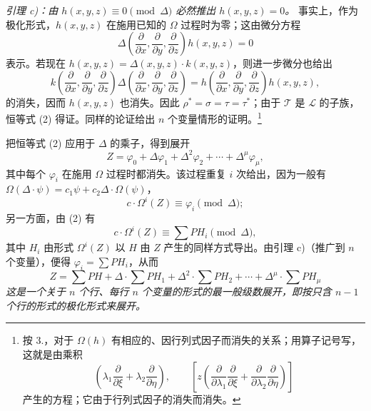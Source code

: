 \emph{引理 c)：由 $h(x,y,z)\equiv0\pmod{\Delta}$ 必然推出 $h(x,y,z)=0$。} 事实上，作为极化形式，$h(x,y,z)$ 在施用已知的 $\Omega$ 过程时为零；这由微分方程
\[
  \Delta\!\left(\frac{\partial}{\partial x},\frac{\partial}{\partial y},\frac{\partial}{\partial z}\right)h(x,y,z)=0
\]
表示。若现在 $h(x,y,z)=\Delta(x,y,z)\cdot k(x,y,z)$，则进一步微分也给出
\[
  k\!\left(\frac{\partial}{\partial x},\frac{\partial}{\partial y},\frac{\partial}{\partial z}\right)
  \Delta\!\left(\frac{\partial}{\partial x},\frac{\partial}{\partial y},\frac{\partial}{\partial z}\right)
  =
  h\!\left(\frac{\partial}{\partial x},\frac{\partial}{\partial y},\frac{\partial}{\partial z}\right)h(x,y,z),
\]
的消失，因而 $h(x,y,z)$ 也消失。因此 $\rho^*=\sigma=\tau=\tau^*$；由于 $\mathcal T$ 是 $\mathcal L$ 的子族，恒等式 (2) 得证。同样的论证给出 $n$ 个变量情形的证明。\footnote{按 3.，对于 $\Omega(h)$ 有相应的、因行列式因子而消失的关系；用算子记号写，这就是由乘积
\[
 \left(\lambda_1\frac{\partial}{\partial \xi}+\lambda_2\frac{\partial}{\partial \eta}\right),
 \qquad
 \left[z\left(\frac{\partial}{\partial\lambda_1}\frac{\partial}{\partial \xi}
 +\frac{\partial}{\partial\lambda_2}\frac{\partial}{\partial \eta}\right)\right]
\]
产生的方程；它由于行列式因子的消失而消失。}

把恒等式 (2) 应用于 $\Delta$ 的乘子，得到展开
\[
  Z=\varphi_0+\Delta\varphi_1+\Delta^2\varphi_2+\cdots+\Delta^\mu\varphi_\mu,
\]
其中每个 $\varphi_i$ 在施用 $\Omega$ 过程时都消失。该过程重复 $i$ 次给出，因为一般有 $\Omega(\Delta\cdot\psi)=c_1\psi+c_2\Delta\cdot\Omega(\psi)$，
\[
  c\cdot \Omega^i(Z)\equiv\varphi_i\pmod{\Delta};
\]
另一方面，由 (2) 有
\[
  c\cdot\Omega^i(Z)\equiv\sum PH_i\pmod{\Delta},
\]
其中 $H_i$ 由形式 $\Omega^i(Z)$ 以 $H$ 由 $Z$ 产生的同样方式导出。由引理 c)（推广到 $n$ 个变量），便得 $\varphi_i=\sum PH_i$，从而
\begin{equation}
  Z=\sum PH+\Delta\cdot\sum PH_1+\Delta^2\cdot\sum PH_2+
  \cdots+\Delta^\mu\cdot\sum PH_\mu
\tag{3}
\end{equation}
\emph{这是一个关于 $n$ 个行、每行 $n$ 个变量的形式的最一般级数展开，即按只含 $n-1$ 个行的形式的极化形式来展开。}

